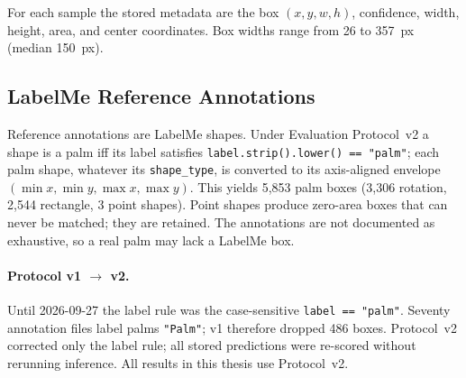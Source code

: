 For each sample the stored metadata are the box $(x, y, w, h)$, confidence,
width, height, area, and center coordinates. Box widths range from 26 to 357~px
(median 150~px).

\subsection{LabelMe Reference Annotations}
\label{sec:method:labelme}
Reference annotations are LabelMe shapes. Under Evaluation Protocol~v2 a shape
is a palm iff its label satisfies
\texttt{label.strip().lower() == "palm"}; each palm shape, whatever its
\texttt{shape\_type}, is converted to its axis-aligned envelope
$(\min x, \min y, \max x, \max y)$. This yields 5{,}853 palm boxes
(3{,}306 rotation, 2{,}544 rectangle, 3 point shapes). Point shapes produce
zero-area boxes that can never be matched; they are retained.
The annotations are not documented as exhaustive, so a real palm may lack a
LabelMe box.

\paragraph{Protocol v1 $\rightarrow$ v2.} Until 2026-09-27 the label rule was
the case-sensitive \texttt{label == "palm"}. Seventy annotation files label palms
\texttt{"Palm"}; v1 therefore dropped 486 boxes. Protocol~v2 corrected only the
label rule; all stored predictions were re-scored without rerunning inference.
All results in this thesis use Protocol~v2.

